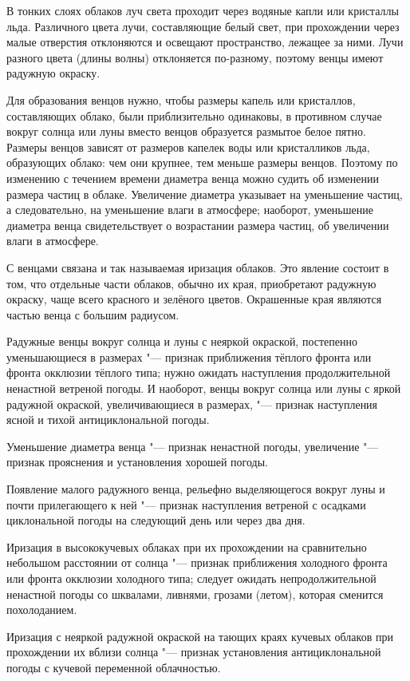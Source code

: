 В тонких слоях облаков луч света проходит через водяные капли или
кристаллы льда. Различного цвета лучи, составляющие белый свет, при
прохождении через малые отверстия отклоняются и освещают пространство,
лежащее за ними. Лучи разного цвета (длины волны) отклоняется
по-разному, поэтому венцы имеют радужную окраску.

Для образования венцов нужно, чтобы размеры капель или кристаллов,
составляющих облако, были приблизительно одинаковы, в противном случае
вокруг солнца или луны вместо венцов образуется размытое белое
пятно. Размеры венцов зависят от размеров капелек воды или
кристалликов льда, образующих облако: чем они крупнее, тем меньше
размеры венцов. Поэтому по изменению с течением времени диаметра венца
можно судить об изменении размера частиц в облаке. Увеличение диаметра
указывает на уменьшение частиц, а следовательно, на уменьшение влаги в
атмосфере; наоборот, уменьшение диаметра венца свидетельствует о
возрастании размера частиц, об увеличении влаги в атмосфере.

С венцами связана и так называемая иризация облаков. Это явление
состоит в том, что отдельные части облаков, обычно их края,
приобретают радужную окраску, чаще всего красного и зелёного
цветов. Окрашенные края являются частью венца с большим радиусом.

 Радужные венцы вокруг солнца и луны с неяркой окраской,
постепенно уменьшающиеся в размерах "--- признак приближения тёплого
фронта или фронта окклюзии тёплого типа; нужно ожидать наступления
продолжительной ненастной ветреной погоды. И наоборот, венцы вокруг
солнца или луны с яркой радужной окраской, увеличивающиеся в размерах,
"--- признак наступления ясной и тихой антициклональной погоды.

 Уменьшение диаметра венца "--- признак ненастной погоды,
увеличение "--- признак прояснения и установления хорошей погоды.

 Появление малого радужного венца, рельефно выделяющегося вокруг
луны и почти прилегающего к ней "--- признак наступления ветреной с
осадками циклональной погоды на следующий день или через два дня.

 Иризация в высококучевых облаках при их прохождении на
сравнительно небольшом расстоянии от солнца "--- признак приближения
холодного фронта или фронта окклюзии холодного типа; следует ожидать
непродолжительной ненастной погоды со шквалами, ливнями, грозами
(летом), которая сменится похолоданием.

 Иризация с неяркой радужной окраской на тающих краях кучевых
облаков при прохождении их вблизи солнца "--- признак установления
антициклональной погоды с кучевой переменной облачностью.

